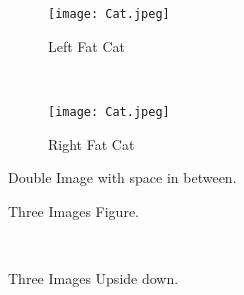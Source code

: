 \documentclass[12pt, oneside]{article}   	%
\begin{document}
\newpage
\begin{figure}[H]
    \centering
    \begin{subfigure}[t]{0.5\textwidth}
        \centering
        \texttt{[image: Cat.jpeg]}
        \caption{Left Fat Cat}
    \end{subfigure}%
    ~ 
    \begin{subfigure}[t]{0.5\textwidth}
        \centering
        \texttt{[image: Cat.jpeg]}
        \caption{Right Fat Cat}
    \end{subfigure}
    \caption{Double Image with space in between. }
\end{figure}




\newpage
\begin{figure}[H]
\begin{minipage}{.5\linewidth}
\centering
{}
\end{minipage}%
\begin{minipage}{.5\linewidth}
\centering
{}
\end{minipage}\par\medskip
\centering
{}
\caption{Three Images Figure.}
\label{fig:3}
\end{figure}


\newpage
\begin{figure}[H]
    \centering
    \\
    \caption{Three Images Upside down.}

\end{figure}
\end{document}

